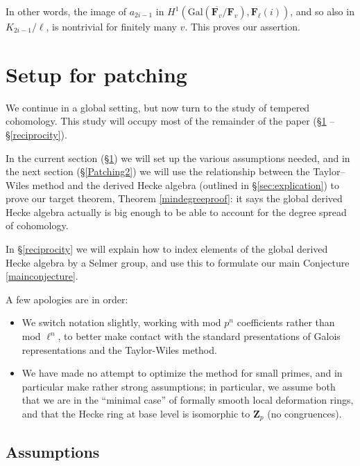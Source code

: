 \documentclass[10pt]{amsart}
\newcommand{\Z}{\mathbf{Z}}
\theoremstyle{remark}
\begin{document}
 In other words, the image of $a_{2i-1}$ in $H^1(\mathrm{Gal}(\overline{\mathbf{F}_v}/\mathbf{F}_v), \mathbf{F}_{\ell}(i)) $,
 and so also in $K_{2i-1}/\ell$, 
 is nontrivial for finitely many $v$.  This proves our assertion. 


\section{Setup for patching}  \label{Patching} 

We continue in a global setting, but now turn to the study of tempered cohomology. This study 
will occupy most of the remainder of the paper (\S \ref{Patching} -- \S \ref{reciprocity}). 

 In the current section (\S \ref{Patching}) we will set up  the various assumptions needed,
 and in the next section (\S \ref{Patching2}) we will use the relationship between
 the Taylor--Wiles method and the derived Hecke algebra (outlined in \S \ref{sec:explication})
 to prove our target theorem, Theorem \ref{mindegreeproof}: it says the global derived Hecke algebra
actually is big enough to be able to account for the degree spread of cohomology.  



In \S \ref{reciprocity} we will explain how to index elements of the global derived Hecke algebra by a Selmer group,
and use this to formulate our main Conjecture \ref{mainconjecture}.


A few apologies are in order:
 \begin{itemize}
 

\item 
 We   switch notation slightly, working with mod $p^n$ coefficients rather than mod $\ell^n$, to better
make contact with the standard presentations of Galois representations and the Taylor-Wiles method.

\item We have made no attempt to optimize the method for small primes,
and in particular make rather strong assumptions; in particular, we assume both that 
we are in the ``minimal case'' of formally smooth local deformation rings, and that
the Hecke ring at base level is isomorphic to $\Z_p$ (no congruences). 

\end{itemize}

\subsection{Assumptions}  \label{Sec:assumptions}
  
\end{document}
